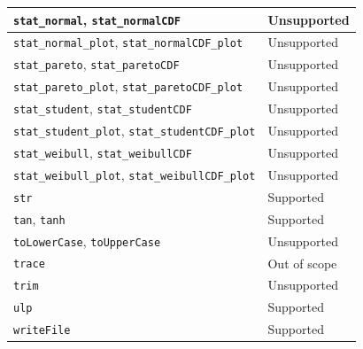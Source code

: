 \begin{longtable}{|p{4cm}|p{9cm}|}
        \texttt{stat\_normal}, \texttt{stat\_normalCDF} & Unsupported \\
        \hline
        \texttt{stat\_normal\_plot}, \texttt{stat\_normalCDF\_plot} & Unsupported \\
        \hline
        \texttt{stat\_pareto}, \texttt{stat\_paretoCDF} & Unsupported \\
        \hline
        \texttt{stat\_pareto\_plot}, \texttt{stat\_paretoCDF\_plot} & Unsupported \\
        \hline
        \texttt{stat\_student}, \texttt{stat\_studentCDF} & Unsupported \\
        \hline
        \texttt{stat\_student\_plot}, \texttt{stat\_studentCDF\_plot} & Unsupported \\
        \hline
        \texttt{stat\_weibull}, \texttt{stat\_weibullCDF} & Unsupported \\
        \hline
        \texttt{stat\_weibull\_plot}, \texttt{stat\_weibullCDF\_plot} & Unsupported \\
        \hline
        \texttt{str} & Supported \\
        \hline
        \texttt{tan}, \texttt{tanh} & Supported \\
        \hline
        \texttt{toLowerCase}, \texttt{toUpperCase} & Unsupported \\
        \hline
        \texttt{trace} & Out of scope \\
        \hline
        \texttt{trim} & Unsupported \\
        \hline
        \texttt{ulp} & Supported \\
        \hline
        \texttt{writeFile} & Supported \\
        \hline
\end{longtable}
